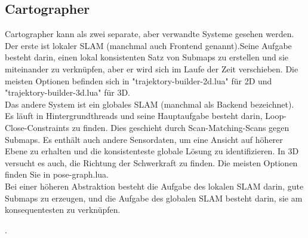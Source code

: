 \documentclass[de,ids]{fziartcl}
\begin{document}
\subsection{Cartographer}
Cartographer kann als zwei separate, aber verwandte Systeme gesehen werden. Der erste ist lokaler SLAM (manchmal auch Frontend genannt).Seine Aufgabe besteht darin, einen lokal konsistenten Satz von Submaps zu erstellen und sie miteinander zu verknüpfen, aber er wird sich im Laufe der Zeit verschieben. Die meisten Optionen befinden sich in "trajektory-builder-2d.lua" für 2D und "trajektory-builder-3d.lua" für 3D.
\\Das andere System ist ein globales SLAM (manchmal als Backend bezeichnet). Es läuft in Hintergrundthreads und seine Hauptaufgabe besteht darin, Loop-Close-Constraints zu finden. Dies geschieht durch Scan-Matching-Scans gegen Submaps. Es enthält auch andere Sensordaten, um eine Ansicht auf höherer Ebene zu erhalten und die konsistenteste globale Lösung zu identifizieren. In 3D versucht es auch, die Richtung der Schwerkraft zu finden. Die meisten Optionen finden Sie in pose-graph.lua.
\\Bei einer höheren Abstraktion besteht die Aufgabe des lokalen SLAM darin, gute Submaps zu erzeugen, und die Aufgabe des globalen SLAM besteht darin, sie am konsequentesten zu verknüpfen.





\cite{quigley2009ros}.


\end{document}
